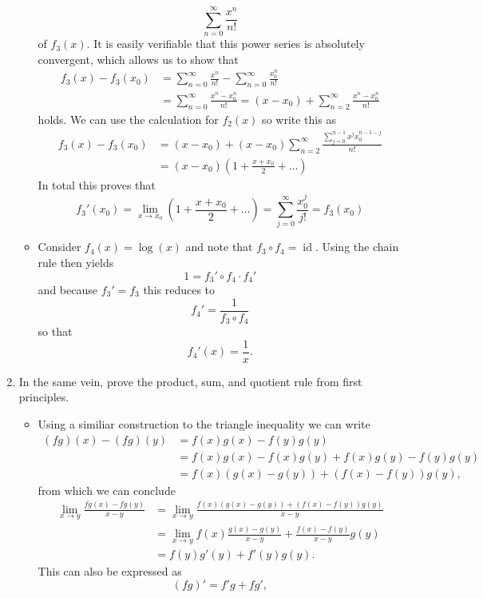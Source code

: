 \documentclass{article}
\begin{document}
\begin{enumerate}
\begin{itemize}
	$$
	\sum_{n = 0}^\infty \frac{x^n}{n!}
	$$
	of $f_3(x)$. It is easily verifiable that this power series is absolutely convergent, which allows us to show that
	\begin{align*}
	f_3(x) - f_3(x_0) &= \sum_{n = 0}^\infty \frac{x^n}{n!} - \sum_{n = 0}^\infty \frac{x_0^n}{n!} \\
	&= \sum_{n = 0}^\infty \frac{x^n - x_0^n}{n!} = (x - x_0) + \sum_{n = 2}^\infty\frac{x^n - x_0^n}{n!}
	\end{align*}
	holds. We can use the calculation for $f_2(x)$ so write this as
	\begin{align*}
	f_3(x) - f_3(x_0) &= (x - x_0) + (x - x_0) \sum_{n = 2}^\infty \frac{\sum_{j = 0}^{n - 1} x^j x_0^{n - 1 - j}}{n!} \\
	&= (x - x_0) \left(1 + \frac{x + x_0}{2} + \dots \right)
	\end{align*}
	In total this proves that
	$$
	f_3'(x_0) = \lim_{x \rightarrow x_0} \left(1 + \frac{x + x_0}{2} + \dots \right) = \sum_{j = 0}^\infty \frac{x_0^j}{j!} = f_3(x_0)
	$$
	\item Consider $f_4(x) = \log(x)$ and note that $f_3 \circ f_4 = \operatorname{id}$. Using the chain rule then yields
	$$
	1 = f_3' \circ f_4 \cdot f_4'
	$$
	and because $f_3' = f_3$ this reduces to
	$$
	f_4' = \frac{1}{f_3 \circ f_4}
	$$
	so that
	$$
	f_4'(x) = \frac{1}{x}.
	$$
	\end{itemize}
\item In the same vein, prove the product, sum, and quotient rule from first principles.
	\begin{itemize}
	\item Using a similiar construction to the triangle inequality we can write
	\begin{align*}
	(fg)(x) - (fg)(y) &= f(x)g(x) - f(y)g(y) \\
	&= f(x)g(x) - f(x)g(y) + f(x)g(y) - f(y)g(y) \\
	&= f(x)(g(x) - g(y)) + (f(x) - f(y))g(y),
	\end{align*}
	from which we can conclude
	\begin{align*}
	\lim_{x \rightarrow y} \frac{fg(x) - fg(y)}{x - y} &= \lim_{x \rightarrow y} \frac{f(x)(g(x) - g(y)) + (f(x) - f(y))g(y)}{x - y} \\
	&= \lim_{x \rightarrow y} f(x) \frac{g(x) - g(y)}{x - y} + \frac{f(x) - f(y)}{x - y} g(y) \\
	&= f(y) g'(y) + f'(y)g(y).
	\end{align*}
	This can also be expressed as
	$$
	(fg)' = f'g + fg',
$$
\end{itemize}
\end{enumerate}
\end{document}
